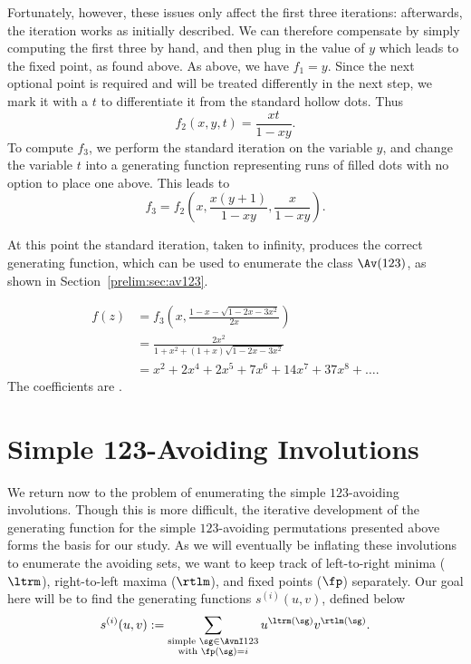 \documentclass[12pt,twoside]{memoir}
\begin{document}
      Fortunately, however, these issues only affect the first three iterations:
      afterwards, the iteration works as initially described. We can therefore
      compensate by simply computing the first three by hand, and then plug in
      the value of $y$ which leads to the fixed point, as found above. 
      As above, we have $f_1 = y$. Since the next optional point is required and
      will be treated differently in the next step, we mark it with a $t$ to
      differentiate it from the standard hollow dots. Thus 
      $$ f_2(x,y,t) = \frac{xt}{1 - xy}.$$
      To compute $f_3$, we perform the standard iteration on the variable $y$,
      and change the variable $t$ into a generating function representing runs of
      filled dots with no option to place one above. This leads to 
      $$ f_3 = f_2 \left( x, \frac{x(y+1)}{1-xy}, \frac{x}{1-xy}\right).$$
    
      At this point the standard iteration, taken to infinity, produces the
      correct generating function, which can be used to enumerate the class $\Av
      (123)$, as shown in Section~\ref{prelim:sec:av123}. 


      \begin{equation} \label{eqn:genfcn-simple123perms}
      \begin{split}
        f(z) &= f_3\left(x, \frac{1 - x - \sqrt{1 - 2x - 3x^2}}{2x}\right) \\
          &= \frac{2x^2}{1 + x^2 + (1+x)\sqrt{1 - 2x - 3x^2}} \\
          &= x^2 + 2x^4 + 2x^5 + 7x^6 + 14x^7 + 37x^8 + \dots.
        \end{split}
      \end{equation}
      The coefficients are . 



  \section{Simple 123-Avoiding Involutions}
  \label{involutions:sec:123simples}

    We return now to the problem of enumerating the simple $123$-avoiding
    involutions. Though this is more difficult, the iterative development of the
    generating function for the simple $123$-avoiding permutations presented above
    forms the basis for our study. As we will eventually be inflating these
    involutions to enumerate the avoiding sets, we want to keep track of
    left-to-right minima ($\ltrm$), right-to-left maxima ($\rtlm$), and fixed
    points ($\fp$) separately.  Our goal here will be to find the generating
    functions $s^{(i)}(u,v)$, defined below
    $$ s^{(i)}(u,v) := \sum_{\substack{
              \text{simple } \sg \in \AvnI 123 \\
              \text{with } \fp(\sg) = i }}
              u^{\ltrm(\sg)} v^{\rtlm(\sg)} .$$
\end{document}
